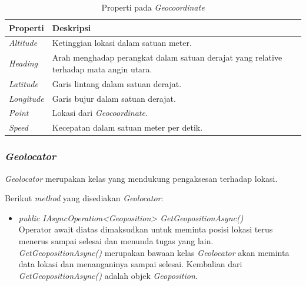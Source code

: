\begin{table}[h]
	\centering
		\begin{tabular}{ |p{4cm}|p{10cm}|}
				\hline
				Properti & Deskripsi \\ \hline
				\textit{Altitude} & Ketinggian lokasi dalam satuan meter. \\ \hline
				\textit{Heading} & Arah menghadap perangkat dalam satuan derajat yang relative terhadap mata angin utara. \\ \hline
				\textit{Latitude} & Garis lintang dalam satuan derajat. \\ \hline
				\textit{Longitude}  & Garis bujur dalam satuan derajat. \\ \hline
				\textit{Point} & Lokasi dari \textit{Geocoordinate}. \\ \hline
				\textit{Speed} & Kecepatan dalam satuan meter per detik. \\ \hline
				\hline
		\end{tabular}
	\caption{Properti pada \textit{Geocoordinate}}
	\label{tab:PropertiPadaKelasGeocoordinate}
\end{table} 

\subsubsection{\textit{Geolocator}}
\label{subsubsec:Kelas Geolocator}
\hspace{0.5cm} \textit{Geolocator} merupakan kelas yang mendukung pengaksesan terhadap lokasi.

Berikut \textit{method} yang disediakan \textit{Geolocator}:
\begin{itemize}
	\item \textit{public IAsyncOperation<Geoposition> GetGeopositionAsync()} \\
		Operator await diatas dimaksudkan untuk meminta posisi lokasi terus menerus sampai selesai dan menunda tugas yang lain. \\
		\textit{GetGeopositionAsync()} merupakan bawaan kelas \textit{Geolocator} akan meminta data lokasi dan menanganinya sampai selesai.
		Kembalian dari \textit{GetGeopositionAsync()} adalah objek \textit{Geoposition}.
\end{itemize}

